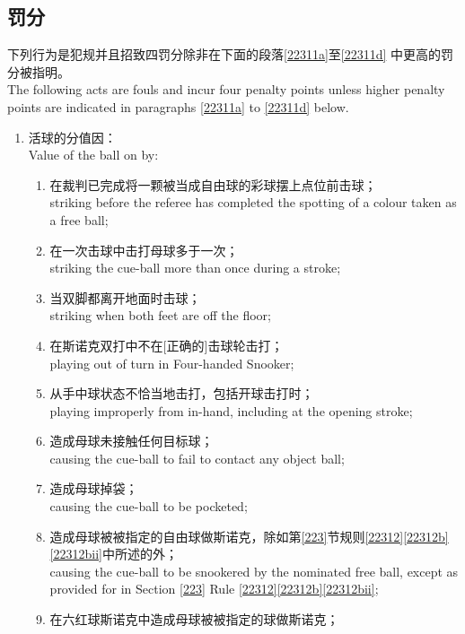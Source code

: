 \subsection{罚分}\label{22311}

\noindent 下列行为是犯规并且招致四罚分除非在下面的段落\ref{22311a}至\ref{22311d} 中更高的罚分被指明。\\
The following acts are fouls and incur four penalty points unless higher penalty points are indicated in paragraphs \ref{22311a} to \ref{22311d} below.
\begin{enumerate}[label=(\alph*),start=1]
    \item \label{22311a}活球的分值因：\\
    Value of the ball on by:
    \begin{enumerate}[label=(\roman*)]
        \item \label{22311ai}在裁判已完成将一颗被当成自由球的彩球摆上点位前击球；\\
        striking before the referee has completed the spotting of a colour taken as a free ball;
        \item 在一次击球中击打母球多于一次；\\
        striking the cue-ball more than once during a stroke;
        \item \label{22311aiii}当双脚都离开地面时击球；\\
        striking when both feet are off the floor;
        \item 在斯诺克双打中不在[正确的]击球轮击打；\\
        playing out of turn in Four-handed Snooker;
        \item 从手中球状态不恰当地击打，包括开球击打时；\\
        playing improperly from in-hand, including at the opening stroke;
        \item 造成母球未接触任何目标球；\\
        causing the cue-ball to fail to contact any object ball;
        \item 造成母球掉袋；\\
        causing the cue-ball to be pocketed;
        \item 造成母球被被指定的自由球做斯诺克，除如第\ref{223}节规则\ref{22312}\ref{22312b}\ref{22312bii}中所述的外；\\
        causing the cue-ball to be snookered by the nominated free ball, except as provided for in Section \ref{223} Rule \ref{22312}\ref{22312b}\ref{22312bii};
        \item 在六红球斯诺克中造成母球被被指定的球做斯诺克；\\

\end{enumerate}
\end{enumerate}
